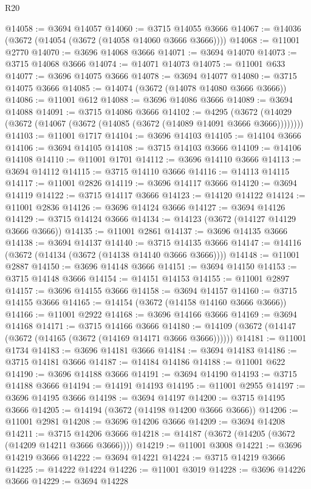 \begin{lexlean}{R20}
\begin{coremodule}
@14058 := @3694 @14057
@14060 := @3715 @14055 @3666
@14067 := @14036 (@3672 (@14054 (@3672 (@14058 @14060 @3666 @3666))))
@14068 := @11001 @2770
@14070 := @3696 @14068 @3666
@14071 := @3694 @14070
@14073 := @3715 @14068 @3666
@14074 := @14071 @14073
@14075 := @11001 @633
@14077 := @3696 @14075 @3666
@14078 := @3694 @14077
@14080 := @3715 @14075 @3666
@14085 := @14074 (@3672 (@14078 @14080 @3666 @3666))
@14086 := @11001 @612
@14088 := @3696 @14086 @3666
@14089 := @3694 @14088
@14091 := @3715 @14086 @3666
@14102 := @4295
    (@3672 (@14029 (@3672 (@14067 (@3672 (@14085 (@3672 (@14089 @14091 @3666 @3666))))))))
@14103 := @11001 @1717
@14104 := @3696 @14103
@14105 := @14104 @3666
@14106 := @3694 @14105
@14108 := @3715 @14103 @3666
@14109 := @14106 @14108
@14110 := @11001 @1701
@14112 := @3696 @14110 @3666
@14113 := @3694 @14112
@14115 := @3715 @14110 @3666
@14116 := @14113 @14115
@14117 := @11001 @2826
@14119 := @3696 @14117 @3666
@14120 := @3694 @14119
@14122 := @3715 @14117 @3666
@14123 := @14120 @14122
@14124 := @11001 @2836
@14126 := @3696 @14124 @3666
@14127 := @3694 @14126
@14129 := @3715 @14124 @3666
@14134 := @14123 (@3672 (@14127 @14129 @3666 @3666))
@14135 := @11001 @2861
@14137 := @3696 @14135 @3666
@14138 := @3694 @14137
@14140 := @3715 @14135 @3666
@14147 := @14116 (@3672 (@14134 (@3672 (@14138 @14140 @3666 @3666))))
@14148 := @11001 @2887
@14150 := @3696 @14148 @3666
@14151 := @3694 @14150
@14153 := @3715 @14148 @3666
@14154 := @14151 @14153
@14155 := @11001 @2897
@14157 := @3696 @14155 @3666
@14158 := @3694 @14157
@14160 := @3715 @14155 @3666
@14165 := @14154 (@3672 (@14158 @14160 @3666 @3666))
@14166 := @11001 @2922
@14168 := @3696 @14166 @3666
@14169 := @3694 @14168
@14171 := @3715 @14166 @3666
@14180 := @14109 (@3672 (@14147 (@3672 (@14165 (@3672 (@14169 @14171 @3666 @3666))))))
@14181 := @11001 @1734
@14183 := @3696 @14181 @3666
@14184 := @3694 @14183
@14186 := @3715 @14181 @3666
@14187 := @14184 @14186
@14188 := @11001 @622
@14190 := @3696 @14188 @3666
@14191 := @3694 @14190
@14193 := @3715 @14188 @3666
@14194 := @14191 @14193
@14195 := @11001 @2955
@14197 := @3696 @14195 @3666
@14198 := @3694 @14197
@14200 := @3715 @14195 @3666
@14205 := @14194 (@3672 (@14198 @14200 @3666 @3666))
@14206 := @11001 @2981
@14208 := @3696 @14206 @3666
@14209 := @3694 @14208
@14211 := @3715 @14206 @3666
@14218 := @14187 (@3672 (@14205 (@3672 (@14209 @14211 @3666 @3666))))
@14219 := @11001 @3008
@14221 := @3696 @14219 @3666
@14222 := @3694 @14221
@14224 := @3715 @14219 @3666
@14225 := @14222 @14224
@14226 := @11001 @3019
@14228 := @3696 @14226 @3666
@14229 := @3694 @14228

\end{coremodule}
\end{lexlean}
